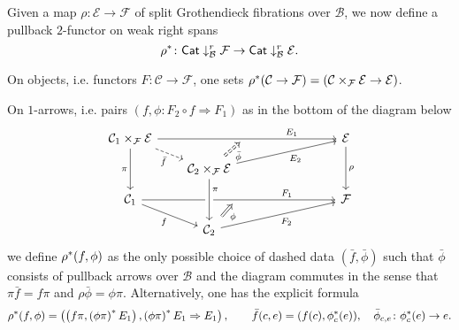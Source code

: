 \documentclass[a4paper,10pt
,draft
]{article}%
\numberwithin{equation}{section}
\numberwithin{figure}{section}
\theoremstyle{definition} %
\newcommand{\1}{\ensuremath{\mathbbm 1}}%
\begin{document}
Given a map $\rho \colon \mathcal{E} \to \mathcal{F}$
of split Grothendieck fibrations over $\mathcal{B}$,
we now define a pullback $2$-functor on weak right spans
\begin{equation}\label{WSPANPULL EQ}
\rho^{\**} \colon
\mathsf{Cat} \downarrow^r_\mathcal{B} \mathcal{F} 
	\to
\mathsf{Cat} \downarrow^r_\mathcal{B} \mathcal{E}.
\end{equation}

On objects, i.e. functors $F \colon \mathcal{C} \to \mathcal{F}$, one sets 
$\rho^{\**}(\mathcal{C} \to \mathcal{F})=
(\mathcal{C} \times_{\mathcal{F}} \mathcal{E}
\to \mathcal{E})
$.

On $1$-arrows, i.e. pairs 
$(f,\phi \colon F_2 \circ f \Rightarrow F_1)$
as in the bottom of the diagram below
\[
\begin{tikzcd}[column sep = 20pt, row sep = small]
	\mathcal{C}_1 \times_{\mathcal{F}} \mathcal{E} 
	\ar{rrrrr}[name=toE]{}[near end]{E_1} \ar[dashed]{rd}[swap]{\bar{f}} \ar{dd}[swap]{\pi}
	&&&
	&&
	\mathcal{E}  \ar{dd}{\rho}
\\
	&
	|[alias=DBE]|
	\mathcal{C}_2 \times_{\mathcal{F}} \mathcal{E} \ar{rrrru}[swap]{E_2}
\\
	\mathcal{C}_1 \ar{rrrrr}[name=toB]{}[near end]{F_1} \ar{rd}[swap]{f}
	&&&
	&&
	\mathcal{F} 
\\
	&
	|[alias=D]| \mathcal{C}_2 \ar{rrrru}[swap]{F_2}
\arrow[Rightarrow, from=DBE, to=toE, shorten <=0.15cm,shorten >=0.15cm,dashed
,swap,"\bar{\phi}"
]
	\arrow[Rightarrow, from=D, to=toB, shorten <=0.15cm,shorten >=0.15cm,swap,"\phi"]
	\arrow[from=DBE, to=D, crossing over, near start, "\pi"]
\end{tikzcd}
\]
we define $\rho^{\**}(f,\phi)$ as the only possible choice of dashed data
$(\bar{f},\bar{\phi})$
such that $\bar{\phi}$ consists of pullback arrows over $\mathcal{B}$
and the diagram commutes in the sense that
$\pi \bar{f} = f \pi$ and 
$\rho \bar{\phi} = \phi \pi$.
Alternatively, one has the explicit formula
\[
\rho^{\**} (f,\phi)=
\left(
	\left( f \pi,
	\left( \phi \pi \right)^{\**} E_1 \right),
	\left( \phi \pi \right)^{\**} E_1 \Rightarrow E_1
  \right)
  ,
  \qquad
  \bar f(c,e) = (f(c), \phi_c^{\**}(e)),
  \quad \bar \phi_{c,e} \colon \phi_c^{\**}(e) \to e.
\]
\end{document}
